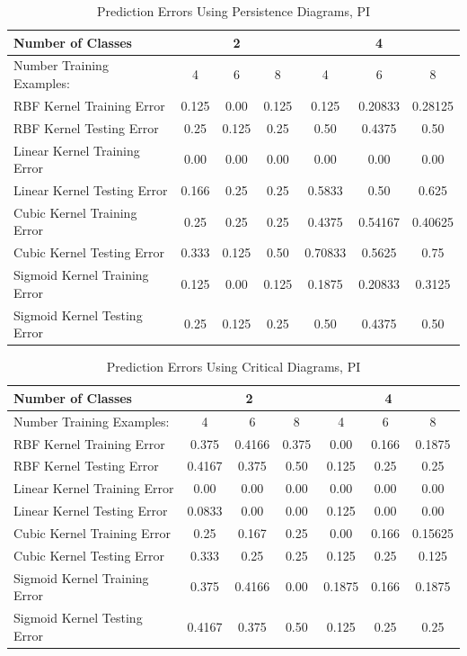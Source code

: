 \documentclass[12pt, fullpage,letterpaper]{article}
\theoremstyle{definition}
\begin{document}
	\begin{table}[h!]
		\centering
		\begin{tabular}{ |l|c|c|c|c|c|c| } 
			\hline
			Number of Classes & \multicolumn{3}{|c|}{2} & \multicolumn{3}{|c|}{4} \\
			\hline
			Number Training Examples:& 4 & 6 & 8 & 4 & 6 & 8 \\ 
			\hline
			RBF Kernel Training Error  & 0.125 & 0.00 & 0.125 & 0.125 & 0.20833 & 0.28125 \\ 
			\hline
			RBF Kernel Testing Error  & 0.25 & 0.125 & 0.25 & 0.50 & 0.4375 & 0.50\\ 
			\hline
			Linear Kernel Training Error  & 0.00 & 0.00 & 0.00 & 0.00 & 0.00 & 0.00 \\ 
			\hline
			Linear Kernel Testing Error  & 0.166 & 0.25 & 0.25 & 0.5833 & 0.50 & 0.625\\ 
			\hline
			Cubic Kernel Training Error  & 0.25 & 0.25 & 0.25 & 0.4375 & 0.54167 & 0.40625 \\ 
			\hline
			Cubic Kernel Testing Error  & 0.333 & 0.125 & 0.50 & 0.70833 & 0.5625 & 0.75\\ 
			\hline
			Sigmoid Kernel Training Error  & 0.125 & 0.00 & 0.125 & 0.1875 & 0.20833 & 0.3125 \\ 
			\hline
			Sigmoid Kernel Testing Error  & 0.25 & 0.125 & 0.25 & 0.50 & 0.4375 & 0.50\\ 
			\hline
		\end{tabular}
		\caption{Prediction Errors Using Persistence Diagrams, PI}
	\end{table}
	\begin{table}[h!]
		\centering
		\begin{tabular}{ |l|c|c|c|c|c|c| } 
			\hline
			Number of Classes & \multicolumn{3}{|c|}{2} & \multicolumn{3}{|c|}{4} \\
			\hline
			Number Training Examples:& 4 & 6 & 8 & 4 & 6 & 8 \\ 
			\hline
			RBF Kernel Training Error  & 0.375 & 0.4166 & 0.375 & 0.00 & 0.166 & 0.1875 \\ 
			\hline
			RBF Kernel Testing Error  & 0.4167 & 0.375 & 0.50 & 0.125 & 0.25 & 0.25\\ 
			\hline
			Linear Kernel Training Error  & 0.00 & 0.00 & 0.00 & 0.00 & 0.00 & 0.00 \\ 
			\hline
			Linear Kernel Testing Error  & 0.0833 & 0.00 & 0.00 & 0.125 & 0.00 & 0.00\\ 
			\hline
			Cubic Kernel Training Error  & 0.25 & 0.167 & 0.25 & 0.00 & 0.166 & 0.15625 \\ 
			\hline
			Cubic Kernel Testing Error  & 0.333 & 0.25 & 0.25 & 0.125 & 0.25 & 0.125\\ 
			\hline
			Sigmoid Kernel Training Error  & 0.375 & 0.4166 & 0.00 & 0.1875 & 0.166 & 0.1875 \\ 
			\hline
			Sigmoid Kernel Testing Error  & 0.4167 & 0.375 & 0.50 & 0.125 & 0.25 & 0.25\\ 
			\hline
		\end{tabular}
		\caption{Prediction Errors Using Critical Diagrams, PI}
	\end{table}
\end{document}
